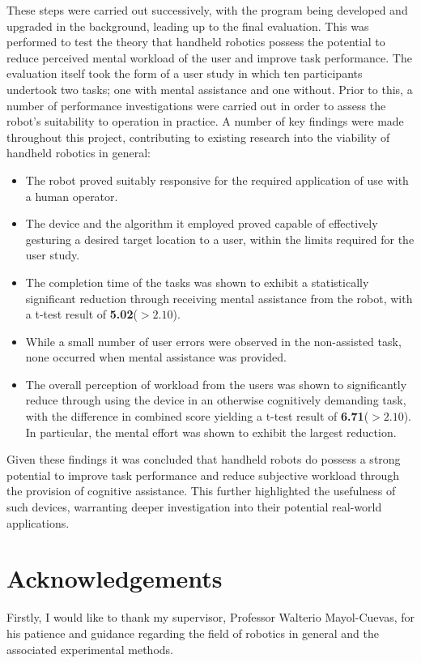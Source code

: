 \documentclass[11pt]{article}
\begin{document}
These steps were carried out successively, with the program being developed and upgraded in the background, leading up to the final evaluation. This was performed to test the theory that handheld robotics possess the potential to reduce perceived mental workload of the user and improve task performance. The evaluation itself took the form of a user study in which ten participants undertook two tasks; one with mental assistance and one without. Prior to this, a number of performance investigations were carried out in order to assess the robot's suitability to operation in practice. A number of key findings were made throughout this project, contributing to existing research into the viability of handheld robotics in general:
\begin{itemize}
\item{The robot proved suitably responsive for the required application of use with a human operator.}
\item{The device and the algorithm it employed proved capable of effectively gesturing a desired target location to a user, within the limits required for the user study.}
\item{The completion time of the tasks was shown to exhibit a statistically significant reduction through receiving mental assistance from the robot, with a t-test result of \textbf{5.02}($>2.10$).}
\item{While a small number of user errors were observed in the non-assisted task, none occurred when mental assistance was provided.}
\item{The overall perception of workload from the users was shown to significantly reduce through using the device in an otherwise cognitively demanding task, with the difference in combined score yielding a t-test result of \textbf{6.71}($>2.10$). In particular, the mental effort was shown to exhibit the largest reduction.}
\end{itemize}

Given these findings it was concluded that handheld robots do possess a strong potential to improve task performance and reduce subjective workload through the provision of cognitive assistance. This further highlighted the usefulness of such devices, warranting deeper investigation into their potential real-world applications. 

\pagebreak

\section*{Acknowledgements}
Firstly, I would like to thank my supervisor, Professor Walterio Mayol-Cuevas, for his patience and guidance regarding the field of robotics in general and the associated experimental methods.  
\end{document}
